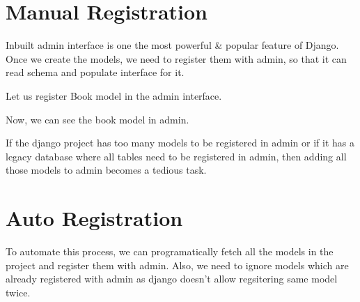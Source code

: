 \documentclass[letterpaper,12pt,english]{sphinxmanual}
\begin{document}
\section{Manual Registration}
\label{\detokenize{admin_auto_register_models:manual-registration}}
Inbuilt admin interface is one the most powerful \& popular feature of Django. Once we create the models, we need to register them with admin, so that it can read schema and populate interface for it.

Let us register Book model in the admin interface.

\begin{sphinxVerbatim}[commandchars=\\\{\}]

   

   


 
        


 
\end{sphinxVerbatim}

Now, we can see the book model in admin.


If the django project has too many models to be registered in admin or if it has a legacy database where all tables need to be registered in admin, then adding all those models to admin becomes a tedious task.


\section{Auto Registration}
\label{\detokenize{admin_auto_register_models:auto-registration}}
To automate this process, we can programatically fetch all the models in the project and register them with admin. Also, we need to ignore models which are already registered with admin as django doesn’t allow regsitering same model twice.
\end{document}
